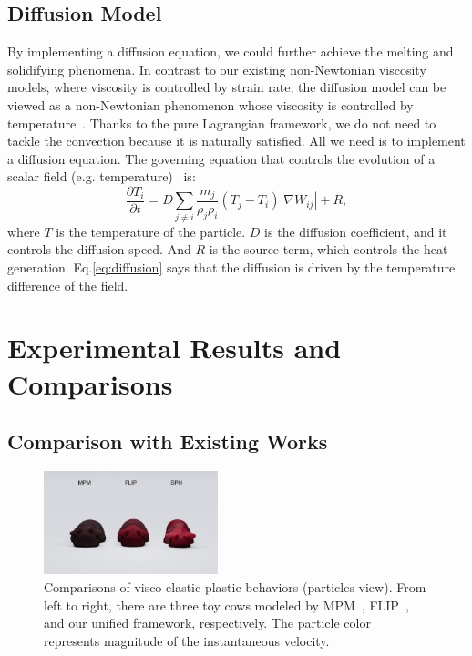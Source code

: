 \documentclass[10pt,journal,compsoc]{IEEEtran}
\begin{document}
\subsection{Diffusion Model}\label{sec:diffusion}
By implementing a diffusion equation, we could further achieve the melting and solidifying phenomena. In contrast to our existing non-Newtonian viscosity models, where viscosity is controlled by strain rate, the diffusion model can be viewed as a non-Newtonian phenomenon whose viscosity is controlled by temperature~\cite{GAO2017anefficient,Su2021}. Thanks to the pure Lagrangian framework, we do not need to tackle the convection because it is naturally satisfied. All we need is to implement a diffusion equation. The governing equation that controls the evolution of a scalar field (e.g. temperature)~\cite{Cleary1999-ConductionSPH, Orthmann2012-Diffusion} is:
\begin{equation}
	\frac{\partial T_i}{\partial t}=D \sum_{j \neq i} \frac{m_j}{\rho_j \rho_i}\left(T_j-T_i\right)\left|\nabla W_{i j}\right|+R,\label{eq:diffusion}
\end{equation}
where $T$ is the temperature of the particle. $D$ is the diffusion coefficient, and it controls the diffusion speed. And $R$ is the source term, which controls the heat generation. Eq.\ref{eq:diffusion} says that the diffusion is driven by the temperature difference of the field.



\section{Experimental Results and Comparisons}

\subsection{Comparison with Existing Works}



\begin{figure}[htbp]
	\centering
	\includegraphics[width=0.45\textwidth]{pics/cow-new.png}
	\caption{Comparisons of visco-elastic-plastic behaviors (particles view). From left to right, there are three toy cows modeled by MPM~\cite{Fang2019-sillyRubber}, FLIP~\cite{Shao-Huang2022-unsmoothed}, and our unified framework, respectively. The particle color represents magnitude of the instantaneous velocity.}      \label{fig:cow1}
\end{figure}
\end{document}
